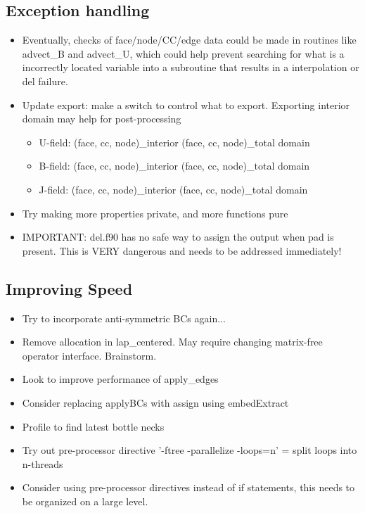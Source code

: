\documentclass[11pt]{article}
\begin{document}
\subsection{Exception handling}
\begin{itemize}
\setlength\itemsep{-1em}
\item Eventually, checks of face/node/CC/edge data could be made in routines like advect\_B and advect\_U, which could help prevent searching for what is a incorrectly located variable into a subroutine that results in a interpolation or del failure.
\item Update export: make a switch to control what to export. Exporting interior domain may help for post-processing
\begin{itemize}
\setlength\itemsep{-1em}
\item U-field: (face, cc, node)\_interior (face, cc, node)\_total domain
\item B-field: (face, cc, node)\_interior (face, cc, node)\_total domain
\item J-field: (face, cc, node)\_interior (face, cc, node)\_total domain
\end{itemize}
\item Try making more properties private, and more functions pure
\item IMPORTANT: del.f90 has no safe way to assign the output when pad is present. This is VERY dangerous and needs to be addressed immediately!
\end{itemize}

\subsection{Improving Speed}
\begin{itemize}
\setlength\itemsep{-1em}
\item Try to incorporate anti-symmetric BCs again...
\item Remove allocation in lap\_centered. May require changing matrix-free operator interface. Brainstorm.
\item Look to improve performance of apply\_edges
\item Consider replacing applyBCs with assign using embedExtract
\item Profile to find latest bottle necks
\item Try out pre-processor directive '-ftree -parallelize -loops=n' = split loops into n-threads
\item Consider using pre-processor directives instead of if statements, this needs to be organized on a large level.
\end{itemize}
\end{document}
